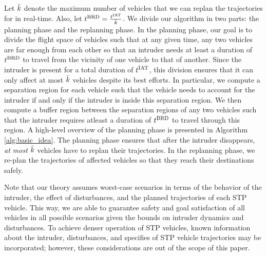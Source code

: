 Let $\bar{k}$ denote the maximum number of vehicles that we can replan the trajectories for in real-time. Also, let $t^\text{BRD} = \frac{t^\text{IAT}}{\bar{k}}$. We divide our algorithm in two parts: the planning phase and the replanning phase. In the planning phase, our goal is to divide the flight space of vehicles such that at any given time, any two vehicles are far enough from each other so that an intruder needs at least a duration of $t^\text{BRD}$ to travel from the vicinity of one vehicle to that of another. Since the intruder is present for a total duration of $t^\text{IAT}$, this division ensures that it can only affect at most $\bar{k}$ vehicles despite its best efforts. In particular, we compute a separation region for each vehicle such that the vehicle needs to account for the intruder if and only if the intruder is inside this separation region. We then compute a buffer region between the separation regions of any two vehicles such that the intruder requires atleast a duration of $t^\text{BRD}$ to travel through this region. A high-level overview of the planning phase is presented in Algorithm \ref{alg:basic_idea}. The planning phase ensures that after the intruder disappears, \textit{at most $\bar{k}$} vehicles have to replan their trajectories. In the replanning phase, we re-plan the trajectories of affected vehicles so that they reach their destinations safely. %

Note that our theory assumes worst-case scenarios in terms of the behavior of the intruder, the effect of disturbances, and the planned trajectories of each STP vehicle. This way, we are able to guarantee safety and goal satisfaction of all vehicles in all possible scenarios given the bounds on intruder dynamics and disturbances. To achieve denser operation of STP vehicles, known information about the intruder, disturbances, and specifies of STP vehicle trajectories may be incorporated; however, these considerations are out of the scope of this paper.

